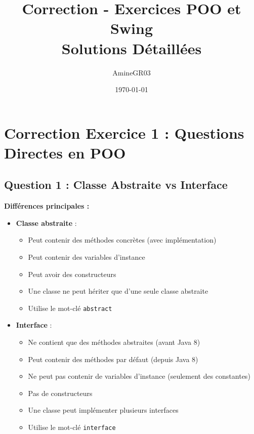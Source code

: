 \documentclass[11pt,a4paper]{article}
\title{Correction - Exercices POO et Swing\\
\large Solutions Détaillées}
\author{AmineGR03}
\date{\today}
\begin{document}
\maketitle

\tableofcontents
\newpage

\section{Correction Exercice 1 : Questions Directes en POO}

\subsection{Question 1 : Classe Abstraite vs Interface}

\begin{correctionbox}
\textbf{Différences principales :}

\begin{itemize}
    \item \textbf{Classe abstraite} :
    \begin{itemize}
        \item Peut contenir des méthodes concrètes (avec implémentation)
        \item Peut contenir des variables d'instance
        \item Peut avoir des constructeurs
        \item Une classe ne peut hériter que d'une seule classe abstraite
        \item Utilise le mot-clé \texttt{abstract}
    \end{itemize}
    
    \item \textbf{Interface} :
    \begin{itemize}
        \item Ne contient que des méthodes abstraites (avant Java 8)
        \item Peut contenir des méthodes par défaut (depuis Java 8)
        \item Ne peut pas contenir de variables d'instance (seulement des constantes)
        \item Pas de constructeurs
        \item Une classe peut implémenter plusieurs interfaces
        \item Utilise le mot-clé \texttt{interface}
    \end{itemize}
\end{itemize}


\end{correctionbox}
\end{document}
